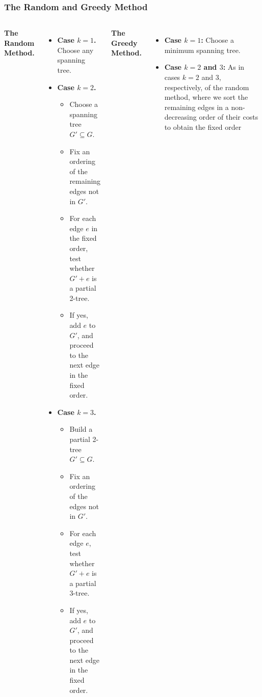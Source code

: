 \documentclass{beamer}
\begin{document}
\begin{frame}
\frametitle{The Random and Greedy Method}
\begin{columns}[t] 
\textbf{The Random Method.}
\begin{itemize}
\item {\bf Case $k=1$.} Choose any spanning tree.
\item {\bf Case $k=2$.} 
\begin{itemize}
\item Choose a spanning tree $G'\subseteq G$.
\item Fix an ordering of the remaining edges not in $G'$.
\item  For each edge $e$ in the fixed order, test whether $G'+e$ is a partial 2-tree.
\item  If yes, add $e$ to $G'$, and proceed to the next edge in the fixed order.
\end{itemize}
\item {\bf Case $k=3$.}
\begin{itemize}
\item Build a partial 2-tree $G'\subseteq G$.
\item Fix an ordering of the edges not in $G'$. 
\item For each edge $e$, test whether $G'+e$ is a partial 3-tree.
\item If yes, add $e$ to $G'$, and proceed to the next edge in the fixed order.
 \end{itemize}
\end{itemize}
\textbf{The Greedy Method.}
\begin{itemize}
\item {\bf Case $k=1$:} Choose a minimum spanning tree.
\item {\bf Case $k=2$ and $3$:} As in cases $k=2$ and $3$, respectively, of the random method, where we sort the remaining edges in a non-decreasing order of their costs to obtain the fixed order
\end{itemize}
\end{columns}
\end{frame}
\end{document}
